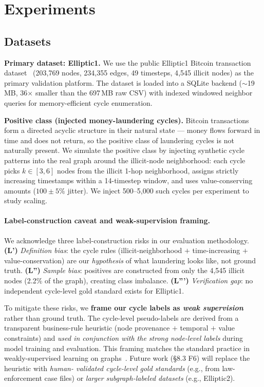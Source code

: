 \documentclass[journal,onecolumn]{IEEEtran}
\begin{document}
\section{Experiments}
\label{sec:exp}

\subsection{Datasets}
\label{sec:exp-data}

\textbf{Primary dataset: Elliptic1.} We use the public Elliptic1 Bitcoin
transaction dataset~\cite{ellipticData2019} (203{,}769 nodes, 234{,}355
edges, 49 timesteps, 4{,}545 illicit nodes) as the primary validation
platform. The dataset is loaded into a SQLite backend ($\sim$19\,MB,
36$\times$ smaller than the 697\,MB raw CSV) with indexed windowed
neighbor queries for memory-efficient cycle enumeration.

\textbf{Positive class (injected money-laundering cycles).} Bitcoin
transactions form a directed acyclic structure in their natural state
--- money flows forward in time and does not return, so the positive
class of laundering cycles is not naturally present. We simulate the
positive class by injecting synthetic cycle patterns into the real graph
around the illicit-node neighborhood: each cycle picks $k \in [3, 6]$
nodes from the illicit 1-hop neighborhood, assigns strictly increasing
timestamps within a 14-timestep window, and uses value-conserving
amounts ($100 \pm 5\%$ jitter). We inject 500--5{,}000 such cycles per
experiment to study scaling.

\paragraph{Label-construction caveat and weak-supervision framing.}

We acknowledge three label-construction risks in our evaluation
methodology. \textbf{(L')} \emph{Definition bias}: the cycle rules
(illicit-neighborhood $+$ time-increasing $+$ value-conservation) are
our \emph{hypothesis} of what laundering looks like, not ground truth.
\textbf{(L'')} \emph{Sample bias}: positives are constructed from
only the 4{,}545 illicit nodes (2.2\% of the graph), creating class
imbalance. \textbf{(L''')} \emph{Verification gap}: no independent
cycle-level gold standard exists for Elliptic1.

To mitigate these risks, we \textbf{frame our cycle labels as
\emph{weak supervision}} rather than ground truth. The cycle-level
pseudo-labels are derived from a transparent business-rule heuristic
(node provenance $+$ temporal $+$ value constraints) and \emph{used in
conjunction with the strong node-level labels} during model training
and evaluation. This framing matches the standard practice in
weakly-supervised learning on graphs~\cite{inspectionL2024,lawal2025}.
Future work (§8.3 F6) will replace the heuristic with \emph{human-
validated cycle-level gold standards} (e.g., from law-enforcement case
files) or \emph{larger subgraph-labeled datasets} (e.g., Elliptic2).
\end{document}
